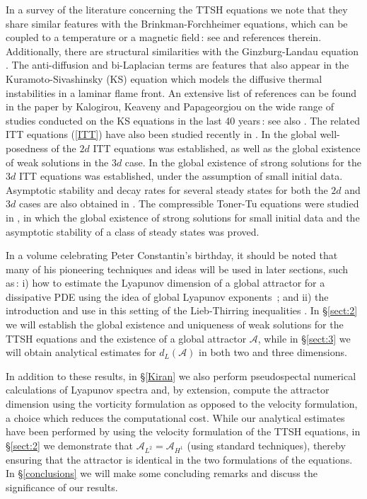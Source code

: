 \documentclass[11pt]{amsart}
\newcommand{\Att}{\mathcal{A}}
\theoremstyle{definition}
\numberwithin{equation}{section}
\numberwithin{equation}{section}
\begin{document}
In a survey of the literature concerning the TTSH equations we note that they share similar features with the Brinkman-Forchheimer equations, which can be coupled to a temperature or a magnetic field\,: see \cite{markowich,titi2019,titi2022} and references therein. Additionally, there are structural similarities with the Ginzburg-Landau equation \cite{doering1988,ghidaglia1987,BCDGG1989,duan1993,LO1997}. The anti-diffusion and bi-Laplacian terms are features that also appear in the Kuramoto-Sivashinsky (KS) equation which models the diffusive thermal instabilities in a laminar flame front. An extensive list of references can be found in the paper by Kalogirou, Keaveny and Papageorgiou \cite{Papa2015} on the wide range of studies conducted on the KS equations in the last 40 years\,: see also \cite{FNST1988,KNS1990,jolly1990}. The related ITT equations (\ref{ITT}) have also been studied recently in \cite{KGPP2023,bae,choi2024}. In \cite{KGPP2023} the global well-posedness of the $2d$ ITT equations was established, as well as the global existence of weak solutions in the $3d$ case. In \cite{bae} the global existence of strong solutions for the $3d$ ITT equations was established, under the assumption of small initial data. Asymptotic stability and decay rates for several steady states for both the $2d$ and $3d$ cases are also obtained in \cite{bae}. The compressible Toner-Tu equations were studied in \cite{choi2024}, in which the global existence of strong solutions for small initial data and the asymptotic stability of a class of steady states was proved.
\par\smallskip
In a volume celebrating Peter Constantin's birthday, it should be noted that many of his pioneering techniques and ideas will be used in later sections, such as\,: i) how to estimate the Lyapunov dimension of a global attractor for a dissipative PDE using the idea of global Lyapunov exponents \cite{ConstantinFoiasattractors,CFT2,ConstantinFoias,CFMT,Constantin1987}\,; and ii) the introduction and use in this setting of the Lieb-Thirring inequalities \cite{Lieb1,Ruelletrace,CFT2}. In \S\ref{sect:2} we will establish the global existence and uniqueness of weak solutions for the TTSH equations and the existence of a global attractor $\mathcal{A}$, while in \S\ref{sect:3} we will obtain analytical estimates for $d_{L}(\mathcal{A})$ in both two and three dimensions. 
\par\smallskip
In addition to these results, in \S\ref{Kiran} we also perform pseudospectal numerical calculations of Lyapunov spectra and, by extension, compute the attractor dimension using the vorticity formulation as opposed to the velocity formulation, a choice which reduces the computational cost. While our analytical estimates have been performed by using the velocity formulation of the TTSH equations, in \S\ref{sect:2} we demonstrate that $\Att_{L^2} = \Att_{H^1}$ (using standard techniques), thereby ensuring that the attractor is identical in the two formulations of the equations. In \S\ref{conclusions} we will make some concluding remarks and discuss the significance of our results.
\end{document}
